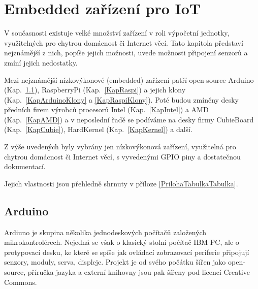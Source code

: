 \chapter{Embedded zařízení pro IoT}

V současnosti existuje velké množství zařízení v roli výpočetní jednotky, využitelných pro chytrou domácnost či Internet věcí. Tato kapitola představí nejznámější z nich, popíše jejich možnosti, uvede možnosti připojení senzorů a zmíní jejich nedostatky. 

Mezi nejznámější nízkovýkonové (embedded) zařízení patří open-source Arduino (Kap.~\ref{KapArduino}), RaspberryPi (Kap.~\ref{KapRaspi}) a jejich klony (Kap.~\ref{KapArduinoKlony} a \ref{KapRaspiKlony}). Poté budou zmíněny desky předních firem výrobců procesorů Intel (Kap.~\ref{KapIntel}) a AMD (Kap.~\ref{KapAMD}) a v neposlední řadě se podíváme na desky firmy CubieBoard (Kap.~\ref{KapCubie}), HardKernel (Kap.~\ref{KapKernel}) a další. 

Z výše uvedených byly vybrány jen nízkovýkonová zařízení, využitelná pro chytrou domácnost či Internet věcí, s vyvedenými GPIO piny a dostatečnou dokumentací.

Jejich vlastnosti jsou přehledně shrnuty v příloze \ref{PrilohaTabulkaTabulka}.


\section{Arduino}
\label{KapArduino}

Ardiuno je skupina několika jednodeskových počítačů založených mikrokontrolérech. Nejedná se však o klasický stolní počítač IBM PC, ale o protypovací desku, ke které se spíše jak ovládací  zobrazovací periferie připojují senzory, moduly, serva, displeje. Projekt je od svého počátku šířen jako open-source, příručka jazyka a externí knihovny jsou pak šířeny pod licencí Creative Commons.
	
